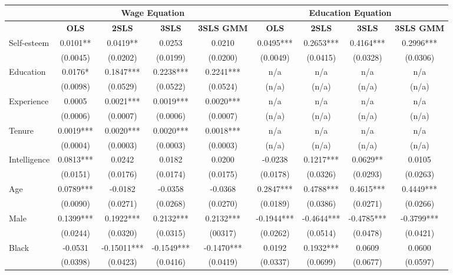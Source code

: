 \documentclass[12pt]{report}
\newcommand{\prbf}[1]{\textbf{#1}}
\begin{document}
\begin{sidewaystable}
\small
\caption{\label{tab:wage80c}}
\vspace{2pt}
\centering\begin{tabular}{lc|c|c|c|c|c|c|c}
\hline
\hline
& \multicolumn{4}{|c|}{Wage Equation} & \multicolumn{4}{|c}{Education Equation}\\
\hline
& \prbf{OLS} & \prbf{2SLS} & \prbf{3SLS} & \prbf{3SLS GMM} & \prbf{OLS} & \prbf{2SLS} & \prbf{3SLS} & \prbf{3SLS GMM}\\
\hline
Self-esteem & 0.0101** & 0.0419** & 0.0253 & 0.0210 & 0.0495*** & 0.2653*** & 0.4164*** & 0.2996***\\
& (0.0045) & (0.0202) & (0.0199) & (0.0200) & (0.0049) & (0.0415) & (0.0328) & (0.0306)\\
Education & 0.0176* & 0.1847*** & 0.2238*** & 0.2241*** & n/a & n/a & n/a & n/a\\
& (0.0098) & (0.0529) & (0.0522) & (0.0524) & (n/a) & (n/a) & (n/a) & (n/a)\\
Experience & 0.0005 & 0.0021*** & 0.0019*** & 0.0020*** & n/a & n/a & n/a & n/a\\
& (0.0006) & (0.0007) & (0.0006) & (0.0007) & (n/a) & (n/a) & (n/a) & (n/a)\\
Tenure & 0.0019*** & 0.0020*** & 0.0020*** & 0.0018*** & n/a & n/a & n/a & n/a\\
& (0.0004) & (0.0003) & (0.0003) & (0.0003) & (n/a) & (n/a) & (n/a) & (n/a)\\
Intelligence & 0.0813*** & 0.0242 & 0.0182 & 0.0200 & -0.0238 & 0.1217*** & 0.0629** & 0.0105\\
& (0.0151) & (0.0176) & (0.0174) & (0.0175) & (0.0178) & (0.0326) & (0.0293) & (0.0263)\\
Age & 0.0789*** & -0.0182 & -0.0358 & -0.0368 & 0.2847*** & 0.4788*** & 0.4615*** & 0.4449***\\
& (0.0090) & (0.0271) & (0.0268) & (0.0270) & (0.0189) & (0.0386) & (0.0271) & (0.0266)\\
Male & 0.1399*** & 0.1922*** & 0.2132*** & 0.2132*** & -0.1944*** & -0.4644*** & -0.4785*** & -0.3799***\\
& (0.0244) & (0.0320) & (0.0315) & (00317) & (0.0262) & (0.0514) & (0.0478) & (0.0421)\\
Black & -0.0531 & -0.15011*** & -0.1549*** & -0.1470*** & 0.0192 & 0.1932*** & 0.0609 & 0.0600\\
& (0.0398) & (0.0423) & (0.0416) & (0.0419) & (0.0337) & (0.0699) & (0.0677) & (0.0597)\\

\end{tabular}
\end{sidewaystable}
\end{document}
